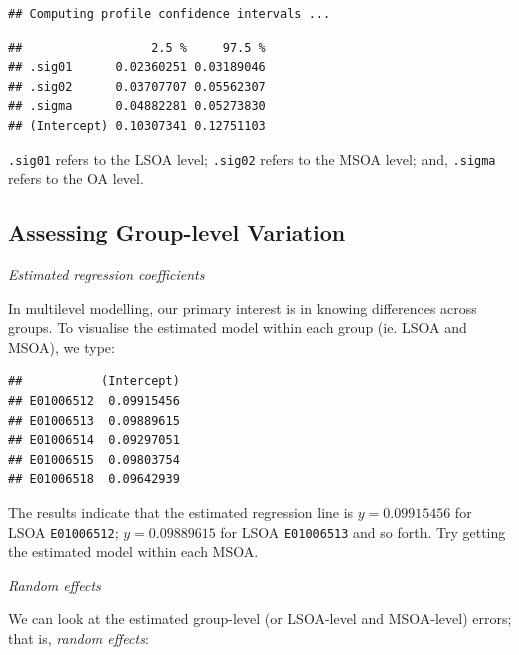 \documentclass[
]{book}
\newenvironment{Shaded}{\begin{snugshade}}{\end{snugshade}}
\newcommand{\DecValTok}[1]{\textcolor[rgb]{0.00,0.00,0.81}{#1}}
\newcommand{\FunctionTok}[1]{\textcolor[rgb]{0.00,0.00,0.00}{#1}}
\newcommand{\NormalTok}[1]{#1}
\newcommand{\OtherTok}[1]{\textcolor[rgb]{0.56,0.35,0.01}{#1}}
\newcommand{\SpecialCharTok}[1]{\textcolor[rgb]{0.00,0.00,0.00}{#1}}
\begin{document}
\begin{verbatim}
## Computing profile confidence intervals ...
\end{verbatim}

\begin{verbatim}
##                  2.5 %     97.5 %
## .sig01      0.02360251 0.03189046
## .sig02      0.03707707 0.05562307
## .sigma      0.04882281 0.05273830
## (Intercept) 0.10307341 0.12751103
\end{verbatim}

\texttt{.sig01} refers to the LSOA level; \texttt{.sig02} refers to the MSOA level; and, \texttt{.sigma} refers to the OA level.

\hypertarget{assessing-group-level-variation}{%
\subsection{Assessing Group-level Variation}\label{assessing-group-level-variation}}

\emph{Estimated regression coefficients}

In multilevel modelling, our primary interest is in knowing differences across groups. To visualise the estimated model within each group (ie. LSOA and MSOA), we type:

\begin{Shaded}
\end{Shaded}

\begin{verbatim}
##           (Intercept)
## E01006512  0.09915456
## E01006513  0.09889615
## E01006514  0.09297051
## E01006515  0.09803754
## E01006518  0.09642939
\end{verbatim}

The results indicate that the estimated regression line is \(y = 0.09915456\) for LSOA \texttt{E01006512}; \(y = 0.09889615\) for LSOA \texttt{E01006513} and so forth. Try getting the estimated model within each MSOA.

\emph{Random effects}

We can look at the estimated group-level (or LSOA-level and MSOA-level) errors; that is, \emph{random effects}:

\begin{Shaded}
\end{Shaded}
\end{document}
